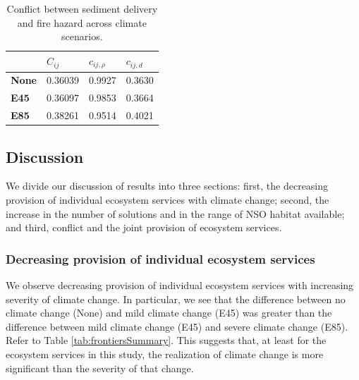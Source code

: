 \begin{table}[]
\centering
\caption[Sediment delivery-fire hazard conflict across climate scenarios]{Conflict between sediment delivery and fire hazard across climate scenarios.}
\label{tab:pairConflict-SedFire}
\begin{tabular}{llll}
\textbf{}     & \textbf{$C_{ij}$} & \textbf{$c_{ij,\rho}$} & \textbf{$c_{ij,d}$} \\ \hline
\textbf{None} & 0.36039           & 0.9927                 & 0.3630              \\
\textbf{E45}  & 0.36097           & 0.9853                 & 0.3664              \\
\textbf{E85}  & 0.38261           & 0.9514                 & 0.4021
\end{tabular}
\end{table}

\subsection{Discussion}
We divide our discussion of results into three sections: first, the decreasing provision of individual ecosystem services with climate change; second, the increase in the number of solutions and in the range of NSO habitat available; and third, conflict and the joint provision of ecosystem services.

\subsubsection{Decreasing provision of individual ecosystem services}
We observe decreasing provision of individual ecosystem services with increasing severity of climate change. In particular, we see that the difference between no climate change (None) and mild climate change (E45) was greater than the difference between mild climate change (E45) and severe climate change (E85). Refer to Table \ref{tab:frontiersSummary}. This suggests that, at least for the ecosystem services in this study, the realization of climate change is more significant than the severity of that change.

